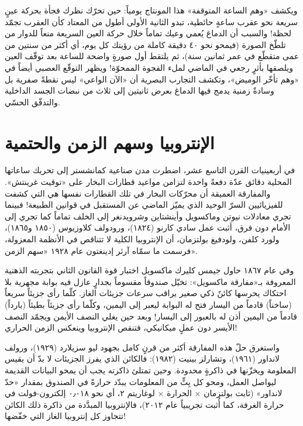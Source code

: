 \documentclass[12pt,a4paper,openany]{book}
\begin{document}
ويكشف «وهم الساعة المتوقفة» هذا المونتاج يومياً: حين تحرّك نظرك فجأة بحركة عينٍ سريعة نحو عقرب ساعةٍ حائطية، تبدو الثانية الأولى أطول من المعتاد كأن العقرب تجمّد لحظة! والسبب أن الدماغ يُعمي وعيك تماماً خلال حركة العين السريعة منعاً للدوار من تلطّخ الصورة (فيمحو نحو ٤٠ دقيقة كاملة من رؤيتك كل يوم، أي أكثر من سنتين من عمى متقطّع في عمر ثمانين سنة)، ثم يلتقط أول صورةٍ واضحة للساعة بعد توقّف العين ويلصقها بأثرٍ رجعي في الماضي لملء الفجوة الممحوّة! ويظهر التوقّع العصبي أيضاً في «وهم تأخّر الوميض»، وتكشف التجارب البصرية أن «الآن الواعي» ليس نقطةً صفرية بل وسادةٌ زمنية يدمج فيها الدماغ بعرض ثانيتين إلى ثلاث من نبضات الجسد الداخلية والتدفّق الحسّي.


\chapter*{الإنتروبيا وسهم الزمن والحتمية}




في أربعينيات القرن التاسع عشر، اضطرت مدن صناعية كمانشستر إلى تحريك ساعاتها المحلية دقائق عدّة دفعةً واحدة لتزامن مواعيد قطارات البخار على «توقيت غرينتش». والمفارقة العميقة أن محرّكات البخار في تلك القطارات نفسها هي التي كشفت للفيزيائيين السرّ الوحيد الذي يميّز الماضي عن المستقبل في قوانين الطبيعة! فبينما تجري معادلات نيوتن وماكسويل وأينشتاين وشرويدنغر إلى الخلف تماماً كما تجري إلى الأمام دون فرق، أثبت عمل سادي كارنو (١٨٢٤)، ورودولف كلاوزيوس (١٨٥٠ و١٨٦٥)، ولورد كلفن، ولودفيغ بولتزمان، أن الإنتروبيا الكلية لا تتناقص في الأنظمة المعزولة، فرسمت ما سمّاه آرثر إدينغتون عام ١٩٢٨ «سهم الزمن».


وفي عام ١٨٦٧ حاول جيمس كليرك ماكسويل اختبار قوة القانون الثاني بتجربته الذهنية المعروفة بـ«مفارقة ماكسويل»: تخيّل صندوقاً مقسوماً بجدارٍ عازل فيه بوابة مجهرية بلا احتكاك يحرسها كائنٌ ذكي صغير يراقب سرعات جزيئات الغاز. كلّما رأى جزيئاً سريعاً (ساخناً) قادماً من اليسار فتح له البوابة ليعبر إلى اليمين، وكلّما رأى جزيئاً بطيئاً (بارداً) قادماً من اليمين أذن له بالعبور إلى اليسار! وبعد حين يغلي النصف الأيمن ويجمّد النصف الأيسر دون عملٍ ميكانيكي، فتنقص الإنتروبيا وينعكس الزمن الحراري!


واستغرق حلّ هذه المفارقة أكثر من قرنٍ كامل بجهود ليو سزيلارد (١٩٢٩)، ورولف لانداور (١٩٦١)، وتشارلز بينيت (١٩٨٢): فالكائن الذي يفرز الجزيئات لا بدّ أن يقيس المعلومة ويخزّنها في ذاكرةٍ محدودة. وحين تمتلئ ذاكرته يجب أن يمحو البيانات القديمة ليواصل العمل، ومحو كل بِتٍّ من المعلومات يبدّد حرارةً في الصندوق بمقدار «حدّ لانداور» (ثابت بولتزمان × الحرارة × لوغاريتم ٢، أي نحو ٠٫٠١٨ إلكترون-فولت في حرارة الغرفة، كما أُثبت تجريبياً عام ٢٠١٢)، فالإنتروبيا المبدَّدة من ذاكرة ذلك الكائن تتجاوز كل إنتروبيا الغاز التي خفّضها!
\end{document}
